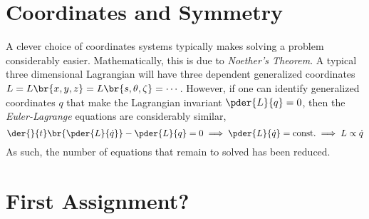 \documentclass{article}
\begin{document}
\titlePage

\tableOfContents

\disclaimer

\section{Coordinates and Symmetry}

A clever choice of coordinates systems typically makes solving a problem considerably easier. Mathematically, this is due to \textit{Noether's Theorem}. A typical three dimensional Lagrangian will have three dependent generalized coordinates $L = L \br{x,y,z} = L \br{s,\theta,\zeta} = \cdots$. However, if one can identify generalized coordinates $q$ that make the Lagrangian invariant $\pder{L}{q} = 0$, then the \textit{Euler-Lagrange} equations are considerably similar,
\[ \der{}{t}\br{\pder{L}{\dot{q}}} - \pder{L}{q} = 0 \implies \pder{L}{\dot{q}} = \textrm{const.} \implies L \propto \dot{q} \]
As such, the number of equations that remain to solved has been reduced.

\section{First Assignment?}

\newcommand{\coord}[4]{\coordinate (#1) at (#2,#3,#4);}
\newcommand{\cylindcoord}[4]{\coordinate (#1) at ({#2*cos(#3)},{#2*sin(#3)},{#4});}
\newcommand{\spherecoord}[4]{\coordinate (#1) at ({#2*cos(#3)*sin(#4)},{#2*sin(#3)*sin(#4)},{#2*cos(#4)});}

\pgfmathsetmacro{}
\pgfmathsetmacro{}
\tdplotsetmaincoords{\th}{\az}
\end{document}
